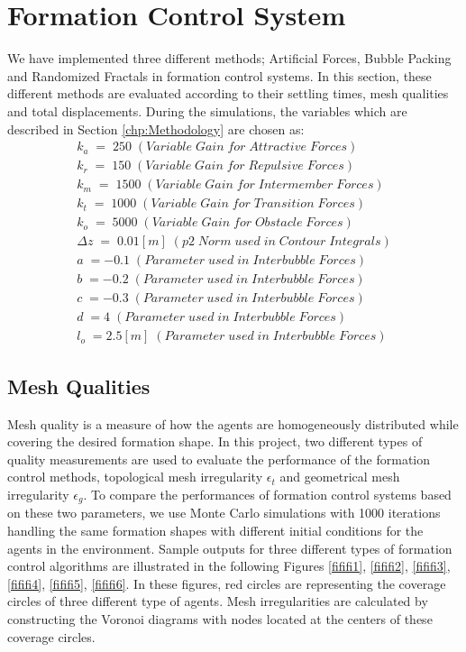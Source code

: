 \section{Formation Control System}
We have implemented three different methods; Artificial Forces, Bubble Packing and Randomized Fractals in formation control systems. In this section, these different methods are evaluated according to their settling times, mesh qualities and total displacements. During the simulations, the variables which are described in Section \ref{chp:Methodology} are chosen as:
\begin{align*}
  k_a\;=\;250\;(Variable\;Gain\;for\;Attractive\;Forces)\\
  k_r\;=\;150\;(Variable\;Gain\;for\;Repulsive\;Forces)\\
  k_m\;=\;1500\;(Variable\;Gain\;for\;Intermember\;Forces)\\
  k_t\;=\;1000\;(Variable\;Gain\;for\;Transition\;Forces)\\
  k_o\;=\;5000\;(Variable\;Gain\;for\;Obstacle\;Forces)\\
  \Delta z\;=\;0.01[m]\;(p2\;Norm\;used\;in\;Contour\;Integrals)\\
  a\;=-0.1\;(Parameter\;used\;in\;Interbubble\;Forces)\\
  b\;=-0.2\;(Parameter\;used\;in\;Interbubble\;Forces)\\ 
  c\;=-0.3\;(Parameter\;used\;in\;Interbubble\;Forces)\\ 
  d\;=4\;(Parameter\;used\;in\;Interbubble\;Forces)\\
  l_o\;=2.5[m]\;(Parameter\;used\;in\;Interbubble\;Forces)     
\end{align*}

\subsection{Mesh Qualities} 
Mesh quality is a measure of how the agents are homogeneously distributed while covering the desired formation shape. In this project, two different types of quality measurements  are used to evaluate the performance of the formation control methods, topological mesh irregularity $\epsilon_t$ and geometrical mesh irregularity $\epsilon_g$. To compare the performances of formation control systems based on these two parameters, we use Monte Carlo simulations with 1000 iterations handling the same formation shapes with different initial conditions for the agents in the environment. Sample outputs for three different types of formation control algorithms are illustrated in the following Figures \ref{fififi1}, \ref{fififi2}, \ref{fififi3}, \ref{fififi4}, \ref{fififi5}, \ref{fififi6}. In these figures, red circles are representing the coverage circles of three different type of agents. Mesh irregularities are calculated by constructing the Voronoi diagrams with nodes located at the centers of these coverage circles.
  
